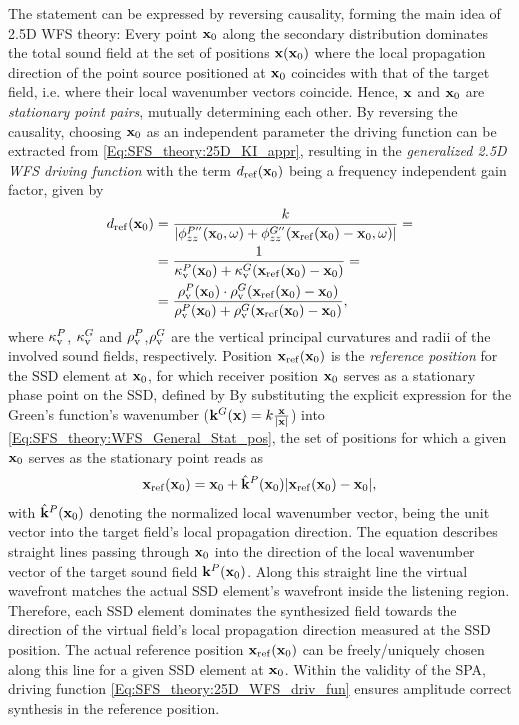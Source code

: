 The statement can be expressed by reversing causality, forming the main idea of 2.5D WFS theory: 
Every point $\mathbf{x}_0$ along the secondary distribution dominates the total sound field at the set of positions $\mathbf{x}(\mathbf{x}_0)$ where the local propagation direction of the point source positioned at $\mathbf{x}_0$ coincides with that of the target field, i.e. where their local wavenumber vectors coincide.
Hence, $\mathbf{x}$ and $\mathbf{x}_0$ are \emph{stationary point pairs}, mutually determining each other.
By reversing the causality, choosing $\mathbf{x}_0$ as an independent parameter the driving function can be extracted from \eqref{Eq:SFS_theory:25D_KI_appr}, resulting in the \emph{generalized 2.5D WFS driving function}
with the term $d_{\mathrm{ref}}(\mathbf{x}_0)$ being a frequency independent gain factor, given by
\begin{align}
\label{Eq:SFS_theory:Referencing function}
d_{\mathrm{ref}}(\mathbf{x}_0) &= \frac{k}{|\phi^{P''}_{zz}(\mathbf{x}_0,\omega) +\phi^{G''}_{zz}(\mathbf{x}_{\mathrm{ref}}(\mathbf{x}_0)-\mathbf{x}_0,\omega)|} =\\
		 	&= \frac{1}{\kappa_\mathrm{v}^P(\mathbf{x}_0)+ \kappa_\mathrm{v}^G(\mathbf{x}_{\mathrm{ref}}(\mathbf{x}_0)-\mathbf{x}_0)}  = \\
			&= \frac{\rho_\mathrm{v}^P(\mathbf{x}_0) \cdot \rho_\mathrm{v}^G(\mathbf{x}_{\mathrm{ref}}(\mathbf{x}_0)-\mathbf{x}_0)}{\rho_\mathrm{v}^P(\mathbf{x}_0)+ \rho_\mathrm{v}^G(\mathbf{x}_{\mathrm{ref}}(\mathbf{x}_0)-\mathbf{x}_0)} 
,
\end{align}
where $\kappa_\mathrm{v}^P$, $\kappa_\mathrm{v}^G$ and $\rho_\mathrm{v}^P$,$\rho_\mathrm{v}^G$ are the vertical principal curvatures and radii of the involved sound fields, respectively.
Position $\mathbf{x}_{\mathrm{ref}}(\mathbf{x}_0)$ is the \emph{reference position} for the SSD element at $\mathbf{x}_0$, for which receiver position $\mathbf{x}_0$ serves as a stationary phase point on the SSD, defined by
By substituting the explicit expression for the Green's function's wavenumber ($\mathbf{k}^G(\mathbf{x}) = k\frac{\mathbf{x}}{|\mathbf{x}|}$) into \eqref{Eq:SFS_theory:WFS_General_Stat_pos}, the set of positions for which a given $\mathbf{x}_0$ serves as the stationary point reads as 
\begin{align} 
\mathbf{x}_{\mathrm{ref}}(\mathbf{x}_0) = \mathbf{x}_0 + \hat{\mathbf{k}}^P(\mathbf{x}_0) |\mathbf{x}_{\mathrm{ref}}(\mathbf{x}_0)-\mathbf{x}_0|,
\label{Eq:SFS_theory:SSD_ref_positions}
\end{align} 
with $\hat{\mathbf{k}}^P(\mathbf{x}_0)$ denoting the normalized local wavenumber vector, being the unit vector into the target field's local propagation direction.
The equation describes straight lines passing through $\mathbf{x}_0$ into the direction of the local wavenumber vector of the target sound field $\mathbf{k}^P(\mathbf{x}_0)$.
Along this straight line the virtual wavefront matches the actual SSD element's wavefront inside the listening region.
Therefore, each SSD element dominates the synthesized field towards the direction of the virtual field's local propagation direction measured at the SSD position.
The actual reference position $\mathbf{x}_{\mathrm{ref}}(\mathbf{x}_0)$ can be freely/uniquely chosen along this line for a given SSD element at $\mathbf{x}_0$. 
Within the validity of the SPA, driving function \eqref{Eq:SFS_theory:25D_WFS_driv_fun} ensures amplitude correct synthesis in the reference position.

